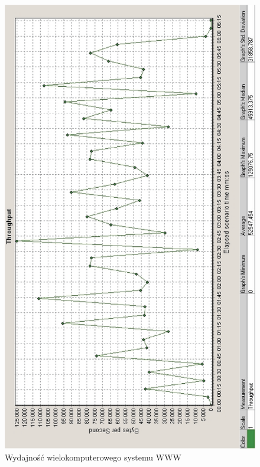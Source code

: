 \begin{figure}[h]
\centering
\includegraphics[width=4.5in]{./rysunki/raport1calybokiem.eps}
\caption{Wydajność wielokomputerowego systemu WWW}
\label{wydajnosc}
\end{figure}
